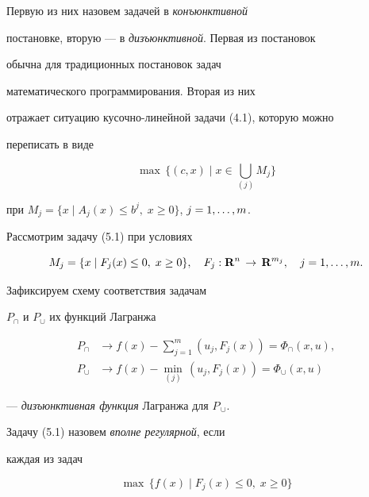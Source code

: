 Первую из них назовем задачей в {\it конъюнктивной}


постановке, вторую --- в {\it дизъюнктивной}. Первая из постановок


обычна для традиционных постановок задач


математического программирования. Вторая из них


отражает ситуацию кусочно-линейной задачи (4.1), которую можно


переписать в виде


$$


\max\, \bigl\{ (c, x) \mid x \in \bigcup_{(j)} M_j \bigr\}


$$


при $M_j =\{ x \mid A_j (x) \le b^j,\; x \ge 0 \}$, $j=1,\dotsc,m$.





Рассмотрим задачу (5.1) при условиях


$$


M_j =\{ x \mid F_j (x) \le 0,\; x \ge 0 \},\quad


F_j: \R^n \,\to\, \R^{m_j},\quad j=\ij{m}.


$$


Зафиксируем схему соответствия задачам


$P_{\cap}$ и $P_{\cup}$ их функций Лагранжа


\begin{equation}


\begin{split}


P_{\cap} & \to f(x) -\sum_{j = 1}^m (u_j, F_j(x))=\varPhi_{\cap}(x,u),\\


P_{\cup} & \to f(x) -\min_{(j)}\, (u_j, F_j (x))=\varPhi_{\cup}(x,u)


\end{split}


\end{equation}


--- {\it дизъюнктивная функция} Лагранжа для $P_{\,\cup}$. 





Задачу (5.1) назовем {\it вполне регулярной}, если


каждая из задач


\begin{equation}


\max\, \{ f(x) \mid F_j (x) \le 0,\; x \ge 0 \}\tag{$5.1_j$}


\end{equation}


